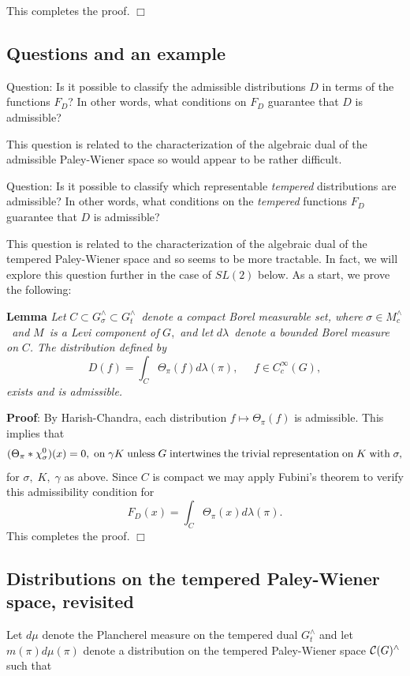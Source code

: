 \documentclass[11pt, a4paper]{article}
\begin{document}
This completes the proof. $\Box $

\subsection{Questions and an example}

{\sc Question}: Is it possible to classify the admissible distributions $D$
in terms of the functions $F_D$? In other words, what conditions on $F_D$
guarantee that $D$ is admissible?

This question is related to the characterization of the algebraic dual of
the admissible Paley-Wiener space so would appear to be rather difficult.

{\sc Question}: Is it possible to classify which representable {\em tempered}
distributions are admissible? In other words, what conditions on the {\em %
tempered} functions $F_D$ guarantee that $D$ is admissible?

This question is related to the characterization of the algebraic dual of
the tempered Paley-Wiener space and so seems to be more tractable. In fact,
we will explore this question further in the case of $SL(2)$ below. As a
start, we prove the following:

{\bf Lemma} {\em Let }$C\subset G_\sigma ^{\wedge }\subset
G_t^{\wedge }${\em \ denote a compact Borel measurable set, where }$\sigma
\in M_c^{\wedge }${\em \ and }$M${\em \ is a Levi component of }$G$,{\em \
and let }$d\lambda ${\em \ denote a bounded Borel measure on }$C${\em . The
distribution defined by}
\[
D(f)=\int_C\Theta _\pi (f)d\lambda (\pi ),\;\;\;\;\;f\in C_c^\infty (G),
\]
{\em exists and is admissible.}

{\bf Proof}: By Harish-Chandra, each distribution $f\longmapsto \Theta _\pi
(f)$ is admissible. This implies that
\[
(\Theta _\pi *\chi _\sigma ^0)(x)=0,\;{\rm on}\;\gamma K\;{\rm unless\;}G\;{\rm %
intertwines\;the\;trivial\;representation\;on\;}K\;{\rm with}\;\sigma ,
\]
for $\sigma ,\;K,\;\gamma $ as above. Since $C$ is compact we may apply Fubini's
theorem to verify this admissibility condition for
\[
F_D(x)=\int_C\Theta _\pi (x)d\lambda (\pi ).
\]
This completes the proof. $\Box $

\subsection{Distributions on the tempered Paley-Wiener space, revisited}

Let $d\mu $ denote the Plancherel measure on the tempered dual $G_t^{\wedge
}$ and let $m(\pi )d\mu (\pi )$ denote a distribution on the tempered
Paley-Wiener space ${\cal C}(G)^{\wedge }$ such that
\end{document}
